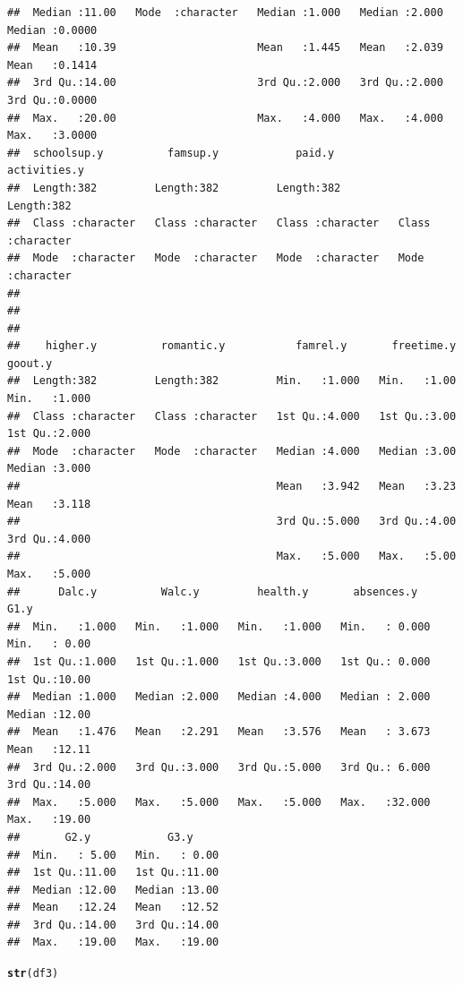 \documentclass{article}\usepackage[]{graphicx}\usepackage[]{xcolor}
\makeatletter
\newcommand{\hlstd}[1]{\textcolor[rgb]{0.345,0.345,0.345}{#1}}%
\newcommand{\hlkwd}[1]{\textcolor[rgb]{0.737,0.353,0.396}{\textbf{#1}}}%
\newenvironment{kframe}{%
 \def\at@end@of@kframe{}%
 \ifinner\ifhmode%
  \def\at@end@of@kframe{\end{minipage}}%
  \begin{minipage}{\columnwidth}%
 \fi\fi%
 \def\FrameCommand##1{\hskip\@totalleftmargin \hskip-\fboxsep
 \colorbox{shadecolor}{##1}\hskip-\fboxsep
     \hskip-\linewidth \hskip-\@totalleftmargin \hskip\columnwidth}%
 \MakeFramed {\advance\hsize-\width
   \@totalleftmargin\z@ \linewidth\hsize
   \@setminipage}}%
 {\par\unskip\endMakeFramed%
 \at@end@of@kframe}
\newenvironment{knitrout}{}{} %
\makeatother
\begin{document}
\begin{knitrout}
\begin{kframe}
\begin{verbatim}
##  Median :11.00   Mode  :character   Median :1.000   Median :2.000   Median :0.0000  
##  Mean   :10.39                      Mean   :1.445   Mean   :2.039   Mean   :0.1414  
##  3rd Qu.:14.00                      3rd Qu.:2.000   3rd Qu.:2.000   3rd Qu.:0.0000  
##  Max.   :20.00                      Max.   :4.000   Max.   :4.000   Max.   :3.0000  
##  schoolsup.y          famsup.y            paid.y          activities.y      
##  Length:382         Length:382         Length:382         Length:382        
##  Class :character   Class :character   Class :character   Class :character  
##  Mode  :character   Mode  :character   Mode  :character   Mode  :character  
##                                                                             
##                                                                             
##                                                                             
##    higher.y          romantic.y           famrel.y       freetime.y      goout.y     
##  Length:382         Length:382         Min.   :1.000   Min.   :1.00   Min.   :1.000  
##  Class :character   Class :character   1st Qu.:4.000   1st Qu.:3.00   1st Qu.:2.000  
##  Mode  :character   Mode  :character   Median :4.000   Median :3.00   Median :3.000  
##                                        Mean   :3.942   Mean   :3.23   Mean   :3.118  
##                                        3rd Qu.:5.000   3rd Qu.:4.00   3rd Qu.:4.000  
##                                        Max.   :5.000   Max.   :5.00   Max.   :5.000  
##      Dalc.y          Walc.y         health.y       absences.y          G1.y      
##  Min.   :1.000   Min.   :1.000   Min.   :1.000   Min.   : 0.000   Min.   : 0.00  
##  1st Qu.:1.000   1st Qu.:1.000   1st Qu.:3.000   1st Qu.: 0.000   1st Qu.:10.00  
##  Median :1.000   Median :2.000   Median :4.000   Median : 2.000   Median :12.00  
##  Mean   :1.476   Mean   :2.291   Mean   :3.576   Mean   : 3.673   Mean   :12.11  
##  3rd Qu.:2.000   3rd Qu.:3.000   3rd Qu.:5.000   3rd Qu.: 6.000   3rd Qu.:14.00  
##  Max.   :5.000   Max.   :5.000   Max.   :5.000   Max.   :32.000   Max.   :19.00  
##       G2.y            G3.y      
##  Min.   : 5.00   Min.   : 0.00  
##  1st Qu.:11.00   1st Qu.:11.00  
##  Median :12.00   Median :13.00  
##  Mean   :12.24   Mean   :12.52  
##  3rd Qu.:14.00   3rd Qu.:14.00  
##  Max.   :19.00   Max.   :19.00
\end{verbatim}
\begin{alltt}
\hlkwd{str}\hlstd{(df3)}
\end{alltt}
\begin{verbatim}

\end{verbatim}
\end{kframe}
\end{knitrout}
\end{document}
